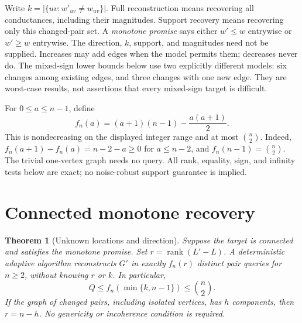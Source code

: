 \documentclass[11pt,letterpaper]{article}
\newtheorem{theorem}{Theorem}
\newcommand{\rank}{\operatorname{rank}}
\begin{document}
Write $k=|\{uv:w'_{uv}\ne w_{uv}\}|$. Full reconstruction means recovering all conductances, including their magnitudes. Support recovery means recovering only this changed-pair set. A \emph{monotone promise} says either $w'\le w$ entrywise or $w'\ge w$ entrywise. The direction, $k$, support, and magnitudes need not be supplied. Increases may add edges when the model permits them; decreases never do. The mixed-sign lower bounds below use two explicitly different models: six changes among existing edges, and three changes with one new edge. They are worst-case results, not assertions that every mixed-sign target is difficult.

For $0\le a\le n-1$, define
\[
 f_n(a)=(a+1)(n-1)-\frac{a(a+1)}2.
\]
This is nondecreasing on the displayed integer range and at most $\binom n2$. Indeed, $f_n(a+1)-f_n(a)=n-2-a\ge0$ for $a\le n-2$, and $f_n(n-1)=\binom n2$. The trivial one-vertex graph needs no query. All rank, equality, sign, and infinity tests below are exact; no noise-robust support guarantee is implied.

\section{Connected monotone recovery}
\begin{theorem}[Unknown locations and direction]\label{thm:connected}
Suppose the target is connected and satisfies the monotone promise. Set $r=\rank(L'-L)$. A deterministic adaptive algorithm reconstructs $G'$ in exactly $f_n(r)$ distinct pair queries for $n\ge2$, without knowing $r$ or $k$. In particular,
\[
 Q\le f_n(\min\{k,n-1\})\le\binom n2.
\]
If the graph of changed pairs, including isolated vertices, has $h$ components, then $r=n-h$. No genericity or incoherence condition is required.
\end{theorem}
\end{document}
